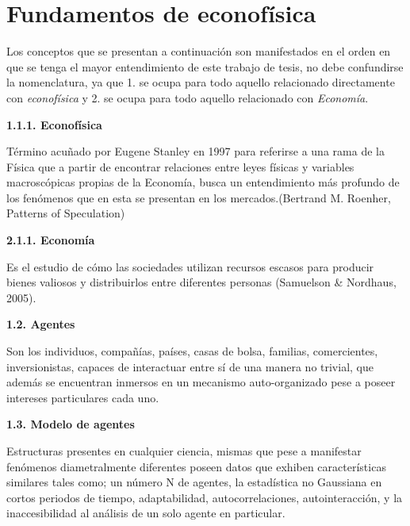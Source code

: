 %
\chapter{Fundamentos de econofísica}
\label{sec:related}



{
    \noindent
 Los conceptos que se presentan a continuación son manifestados en el orden en que se tenga el mayor entendimiento de este trabajo de tesis, no debe confundirse la nomenclatura, ya que 1. se ocupa para todo aquello relacionado directamente con \textit{econofísica} y 2. se ocupa para todo aquello relacionado con \textit{Economía}.\newline
}

{
\noindent
\Large \textbf{1.1.1. Econofísica}
}

Término acuñado por Eugene Stanley en 1997 para referirse a una rama de la Física que a partir de encontrar relaciones entre leyes físicas y variables macroscópicas propias de la Economía, busca un entendimiento más profundo de los fenómenos que en esta se presentan en los mercados.(Bertrand M. Roenher, Patterns of Speculation)
\newline

{
\noindent
\Large  \textbf{2.1.1. Economía} 
}

Es el estudio de cómo las sociedades utilizan recursos escasos para producir bienes valiosos y distribuirlos entre diferentes personas (Samuelson \& Nordhaus, 2005).
\newline

{
\noindent
\Large  \textbf{1.2. Agentes} 
}

Son los individuos, compañías, países, casas de bolsa, familias, comercientes, inversionistas, capaces de interactuar entre sí de una manera no trivial, que además se encuentran inmersos en un mecanismo auto-organizado pese a poseer intereses particulares cada uno.
\newpage

{
\noindent
\Large  \textbf{1.3. Modelo de agentes} 
}

Estructuras presentes en cualquier ciencia, mismas que pese a manifestar fenómenos diametralmente diferentes poseen datos que exhiben características similares tales como; un número N de agentes, la estadística no Gaussiana en cortos periodos de tiempo, adaptabilidad, autocorrelaciones, autointeracción, y la inaccesibilidad al análisis de un solo agente en particular.
\newline

